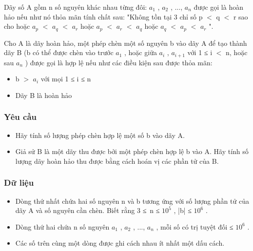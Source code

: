 



   Dãy số A gồm n số nguyên khác nhau từng đôi: $a_{1}$   , $a_{2}$   , ..., $a_{n}$   được gọi là hoàn hảo nếu như nó thỏa mãn tính chất sau: "Không tồn tại 3 chỉ số p $<$ q $<$ r sao cho hoặc $a_{p}$   $<$ $a_{q}$   $<$ $a_{r}$   hoặc $a_{p}$   $<$ $a_{r}$   $<$ $a_{q}$   hoặc $a_{q}$   $<$ $a_{p}$   $<$ $a_{r}$   ".  

   Cho A là dãy hoàn hảo, một phép chèn một số nguyên b vào dãy A để tạo thành dãy B (b có thể được chèn vào trước $a_{1}$   , hoặc giữa $a_{i}$   , $a_{i+1}$   với 1 ≤ i $<$ n, hoặc sau $a_{n}$   ) được gọi là hợp lệ nếu như các điều kiện sau được thỏa mãn:  
\begin{itemize}
	\item     b $>$ $a_{i}$    với mọi 1 ≤ i ≤ n   
	\item     Dãy B là hoàn hảo   
\end{itemize}
\begin{itemize}
\end{itemize}

\subsubsection{   Yêu cầu  }
\begin{itemize}
	\item     Hãy tính số lượng phép chèn hợp lệ một số b vào dãy A.   
	\item     Giả sử B là một dãy thu được bởi một phép chèn hợp lệ b vào A. Hãy tính số lượng dãy hoàn hảo thu được bằng cách hoán vị các phần tử của B.   
\end{itemize}

\subsubsection{   Dữ liệu  }
\begin{itemize}
	\item     Dòng thứ nhất chứa hai số nguyên n và b tương ứng với số lượng phần tử của dãy A và số nguyên cần chèn. Biết rằng 3 ≤ n ≤ $10^{5}$    , |b| ≤ $10^{6}$    .   
	\item     Dòng thứ hai chứa n số nguyên $a_{1}$    , $a_{2}$    , ..., $a_{n}$    , mỗi số có trị tuyệt đối ≤ $10^{6}$    .   
	\item     Các số trên cùng một dòng được ghi cách nhau ít nhất một dấu cách.   
\end{itemize}

